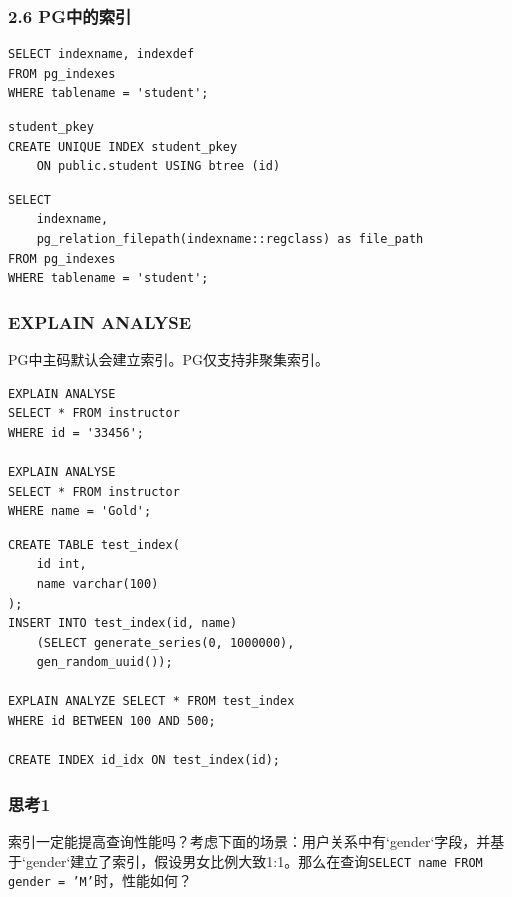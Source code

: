 \documentclass[aspectratio=169, 14pt]{beamer}
\begin{document}
\begin{frame}[fragile]
	\frametitle{2.6 PG中的索引}

	\begin{verbatim}
SELECT indexname, indexdef
FROM pg_indexes
WHERE tablename = 'student';
  \end{verbatim}

	\begin{verbatim}
student_pkey
CREATE UNIQUE INDEX student_pkey 
    ON public.student USING btree (id)
\end{verbatim}


	\begin{verbatim}
SELECT 
    indexname,
    pg_relation_filepath(indexname::regclass) as file_path
FROM pg_indexes 
WHERE tablename = 'student';
\end{verbatim}

\end{frame}

\begin{frame}[fragile]
	\frametitle{EXPLAIN ANALYSE}
	PG中主码默认会建立索引。PG仅支持非聚集索引。

	\begin{verbatim} 
EXPLAIN ANALYSE 
SELECT * FROM instructor
WHERE id = '33456';

EXPLAIN ANALYSE 
SELECT * FROM instructor
WHERE name = 'Gold';
\end{verbatim}
\end{frame}

\begin{frame}[fragile]
	\begin{verbatim} 
CREATE TABLE test_index(
    id int,
    name varchar(100)
);
INSERT INTO test_index(id, name)
    (SELECT generate_series(0, 1000000), 
    gen_random_uuid());

EXPLAIN ANALYZE SELECT * FROM test_index
WHERE id BETWEEN 100 AND 500;

CREATE INDEX id_idx ON test_index(id);
    \end{verbatim}


\end{frame}

\begin{frame}
	\frametitle{思考1}
	索引一定能提高查询性能吗？考虑下面的场景：用户关系中有`gender`字段，并基于`gender`建立了索引，假设男女比例大致1:1。那么在查询\texttt{SELECT name FROM gender = 'M'}时，性能如何？
\end{frame}
\end{document}
